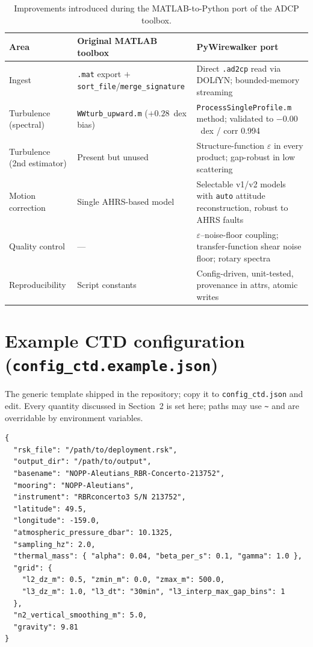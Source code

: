 \documentclass[11pt]{article}
\newcommand{\code}[1]{\texttt{#1}}
\newcommand{\eps}{\varepsilon}
\begin{document}
\begin{table}[h]
\centering
\begin{tabular}{@{}p{} p{} p{}@{}}
\toprule
\textbf{Area} & \textbf{Original MATLAB toolbox} & \textbf{PyWirewalker port} \\
\midrule
Ingest & \code{.mat} export $+$ \code{sort\_file}/\code{merge\_signature} & Direct \code{.ad2cp} read via DOLfYN; bounded-memory streaming \\
Turbulence (spectral) & \code{WWturb\_upward.m} ($+0.28$~dex bias) & \code{ProcessSingleProfile.m} method; validated to $-0.00$~dex / corr 0.994 \\
Turbulence (2nd estimator) & Present but unused & Structure-function $\eps$ in every product; gap-robust in low scattering \\
Motion correction & Single AHRS-based model & Selectable v1/v2 models with \code{auto} attitude reconstruction, robust to AHRS faults \\
Quality control & --- & $\eps$--noise-floor coupling; transfer-function shear noise floor; rotary spectra \\
Reproducibility & Script constants & Config-driven, unit-tested, provenance in attrs, atomic writes \\
\bottomrule
\end{tabular}
\caption{Improvements introduced during the MATLAB-to-Python port of the ADCP toolbox.}
\end{table}

\appendix

\section{Example CTD configuration (\code{config\_ctd.example.json})}

The generic template shipped in the repository; copy it to \code{config\_ctd.json} and edit.
Every quantity discussed in Section~2 is set here; paths may use \code{\textasciitilde} and are
overridable by environment variables.

\begin{lstlisting}[style=cfg]
{
  "rsk_file": "/path/to/deployment.rsk",
  "output_dir": "/path/to/output",
  "basename": "NOPP-Aleutians_RBR-Concerto-213752",
  "mooring": "NOPP-Aleutians",
  "instrument": "RBRconcerto3 S/N 213752",
  "latitude": 49.5,
  "longitude": -159.0,
  "atmospheric_pressure_dbar": 10.1325,
  "sampling_hz": 2.0,
  "thermal_mass": { "alpha": 0.04, "beta_per_s": 0.1, "gamma": 1.0 },
  "grid": {
    "l2_dz_m": 0.5, "zmin_m": 0.0, "zmax_m": 500.0,
    "l3_dz_m": 1.0, "l3_dt": "30min", "l3_interp_max_gap_bins": 1
  },
  "n2_vertical_smoothing_m": 5.0,
  "gravity": 9.81
}
\end{lstlisting}
\end{document}
